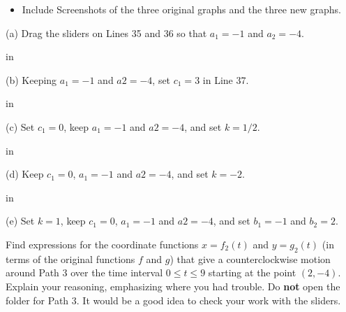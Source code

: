 \documentclass{ximera}
\newcommand{\pskip}{\vskip 0.1 in}
\begin{document}
\begin{example}
\begin{exploration}
\begin{itemize}
\item{Include Screenshots of the three original graphs and the three new graphs.}

\end{itemize}

(a) Drag the sliders on Lines 35 and 36 so that $a_1=-1$ and $a_2=-4$. 

\pskip

(b) Keeping  $a_1 = -1$ and $a2=-4$, set $c_1=3$ in Line 37.  

\pskip

(c) Set $c_1=0$, keep $a_1 = -1$ and $a2=-4$, and set $k=1/2$.

\pskip

(d) Keep $c_1=0$, $a_1 = -1$ and $a2=-4$, and set $k=-2$.

\pskip

(e) Set $k=1$, keep $c_1=0$, $a_1 = -1$ and $a2=-4$, and set $b_1=-1$ and $b_2=2$.


 
\begin{onlineOnly}
    \begin{center}
\end{center}
\end{onlineOnly}
\end{exploration}


\begin{exploration}\label{exp:pc14}
 Find expressions for the coordinate functions $x=f_2(t)$ and $y=g_2(t)$ (in terms of the original functions $f$ and $g$) that give a counterclockwise motion around Path 3 over the time interval $0\leq t \leq 9$ starting at the point $(2,-4)$. Explain your reasoning, emphasizing where you had trouble. Do {\bf not} open the folder for Path 3. It would be a good idea to check your work with the sliders.


 
\begin{onlineOnly}
    \begin{center}
\end{center}
\end{onlineOnly}
\end{exploration}



\end{example}
\end{document}
